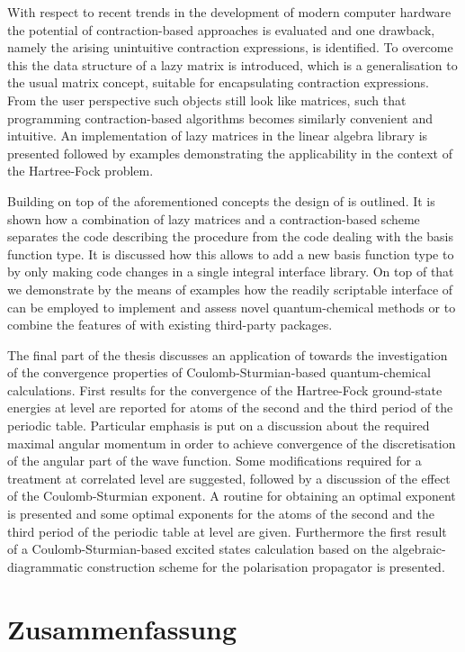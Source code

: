 With respect to recent trends in the development of modern computer hardware
the potential of contraction-based approaches is evaluated
and one drawback,
namely the arising unintuitive contraction expressions,
is identified.
To overcome this the data structure of a lazy matrix is introduced,
which is a generalisation to the usual matrix concept,
suitable for encapsulating contraction expressions.
From the user perspective such objects still look like matrices,
such that programming contraction-based algorithms
becomes similarly convenient and intuitive.
An implementation of lazy matrices in the \lazyten linear algebra library
is presented followed by examples
demonstrating the applicability in the context of the Hartree-Fock problem.

Building on top of the aforementioned concepts the design of \molsturm is outlined.
It is shown how a combination of lazy matrices and a contraction-based \SCF scheme
separates the code describing the \SCF procedure
from the code dealing with the basis function type.
It is discussed how this allows to add a new basis function type
to \molsturm by only making code changes in a single integral interface library.
On top of that we demonstrate by the means of examples
how the readily scriptable interface of \molsturm
can be employed to implement and assess novel quantum-chemical methods
or to combine the features of \molsturm with existing third-party packages.

The final part of the thesis discusses an application of \molsturm
towards the investigation of the convergence properties
of Coulomb-Sturmian-based quantum-chemical calculations.
First results for the convergence
of the Hartree-Fock ground-state energies at \HF level
are reported for atoms of the second and the third period
of the periodic table.
Particular emphasis is put on a discussion about the required
maximal angular momentum in order to achieve convergence
of the discretisation of the angular part of the wave function.
Some modifications required for a treatment at correlated level are suggested,
followed by a discussion of the effect of the Coulomb-Sturmian exponent.
A routine for obtaining an optimal exponent is presented
and some optimal exponents for the atoms of the
second and the third period of the periodic table at \HF level are given.
Furthermore the first result of a Coulomb-Sturmian-based excited
states calculation based on the algebraic-diagrammatic construction
scheme for the polarisation propagator is presented.


%
%
\chapter*{Zusammenfassung}
